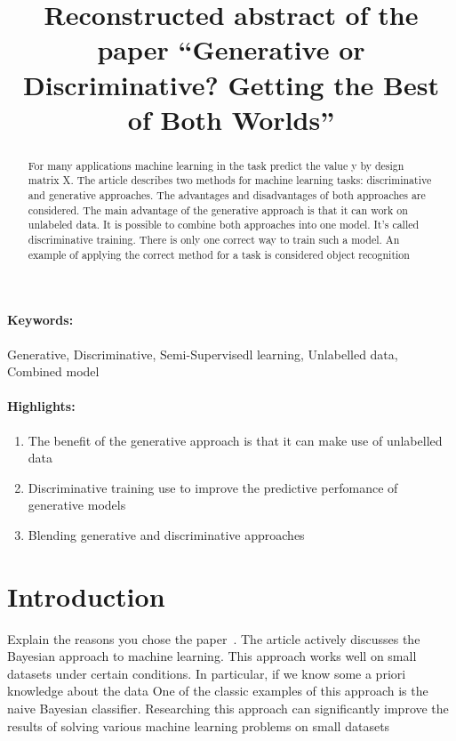 \documentclass[12pt]{article}
\title{Reconstructed abstract of the paper ``Generative or Discriminative? Getting the Best of Both Worlds''}
\date{}
\begin{document}
\maketitle

\begin{abstract}
For many applications machine learning in the task predict the value y by design matrix X. The article
describes two methods for machine learning tasks: discriminative and generative approaches. The advantages and disadvantages of both approaches 
are considered. The main advantage of the generative approach is that it can work on unlabeled data. It is possible to combine both approaches into one model.
It's called discriminative training. There is only one correct way to train such a model. An example of applying the correct method for a task is considered
object recognition
\end{abstract}
\paragraph{Keywords:} Generative, Discriminative, Semi-Supervisedl learning, Unlabelled data, Combined model

\paragraph{Highlights:}
\begin{enumerate}
\item The benefit of the generative approach is that it can make use of unlabelled data
\item Discriminative training use to improve the predictive perfomance of generative models
\item Blending generative and discriminative approaches
\end{enumerate}

\section{Introduction}
Explain the reasons you chose the paper~\cite{homework_article}. The article actively discusses the Bayesian approach to machine learning.
This approach works well on small datasets under certain conditions. In particular, if we know some a priori knowledge about the data
One of the classic examples of this approach is the naive Bayesian classifier. Researching this approach can significantly improve the results of solving various machine learning problems on small datasets



\end{document}
